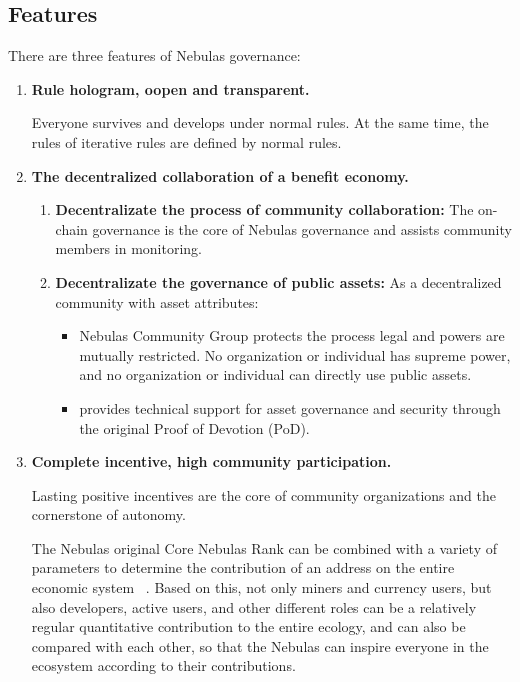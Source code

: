 \subsection{Features}

There are three features of Nebulas governance:

\begin{enumerate}
	\item 

	\textbf{Rule hologram, oopen and transparent.} 

	Everyone survives and develops under normal rules. At the same time, the rules of iterative rules are defined by normal rules.


	\item 

	\textbf{The decentralized collaboration of a benefit economy. }

	\begin{enumerate}
		\item 

		\textbf{Decentralizate the process of community collaboration:} The on-chain governance is the core of Nebulas governance and assists community members in monitoring.
	
		\item 

		\textbf{Decentralizate the governance of public assets:} As a decentralized community with asset attributes:

		\begin{itemize}
			\item Nebulas Community Group protects the process legal and powers are mutually restricted. No organization or individual has supreme power, and no organization or individual can directly use public assets.
			\item provides technical support for asset governance and security through the original Proof of Devotion (PoD).
		\end{itemize}

	\end{enumerate}

	\item 

	\textbf{Complete incentive, high community participation.}
	
	Lasting positive incentives are the core of community organizations and the cornerstone of autonomy.

	The Nebulas original Core Nebulas Rank can be combined with a variety of parameters to determine the contribution of an address on the entire economic system ~\cite{yellowpaper}. Based on this, not only miners and currency users, but also developers, active users, and other different roles can be a relatively regular quantitative contribution to the entire ecology, and can also be compared with each other, so that the Nebulas can inspire everyone in the ecosystem according to their contributions.


\end{enumerate}
